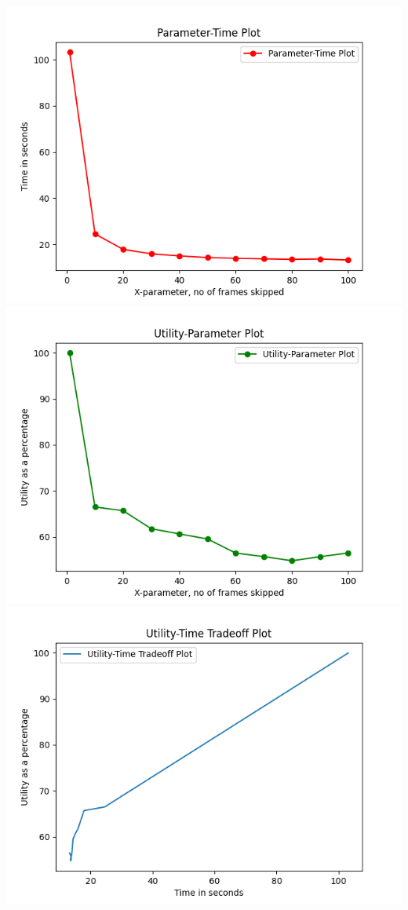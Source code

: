 \documentclass{article} %
\begin{document}
\begin{center}
    \includegraphics[scale = 0.9]{out_images/method_1_time.png}
    \\\includegraphics[scale = 0.9]{out_images/method_1_utility_param.png}
    \\\includegraphics[scale = 0.8]{out_images/method_1_utility.png}
\end{center}
\end{document}
